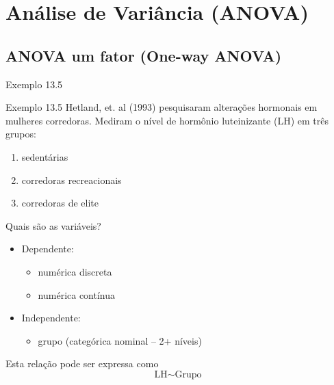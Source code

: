\documentclass{beamer}
\begin{document}

\section[ANOVA]{Análise de Variância (ANOVA)}

\subsection{ANOVA um fator (One-way ANOVA)}

\begin{frame}[label=exemplo13.5]{\small Exemplo 13.5}
  \begin{exampleblock}{Exemplo 13.5}
    Hetland, et. al (1993) pesquisaram alterações hormonais em mulheres corredoras.
    Mediram o nível de hormônio luteinizante (LH) em três grupos:
    \begin{enumerate}
    \item sedentárias
    \item corredoras recreacionais
    \item corredoras de elite
    \end{enumerate}
  \end{exampleblock}
\end{frame}

\begin{frame}{Quais são as variáveis?}
  \begin{itemize}
    \small
  \item Dependente:
    \begin{itemize}
      \footnotesize
    \item numérica discreta
    \item numérica contínua
    \end{itemize}
  \item Independente:
    \begin{itemize}
      \footnotesize
    \item grupo (categórica nominal -- 2+ níveis)
    \end{itemize}
  \end{itemize}
  \vfill
  \begin{block}{Esta relação pode ser expressa como}
    \begin{displaymath}
      \text{LH} \sim \text{Grupo}
    \end{displaymath}
  \end{block}
\end{frame}
\end{document}
